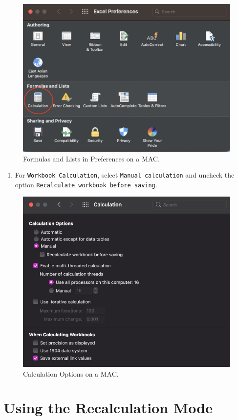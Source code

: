 \documentclass[
]{book}
\providecommand{\tightlist}{%
  \setlength{\itemsep}{0pt}\setlength{\parskip}{0pt}}
\begin{document}
\begin{figure}

{\centering \includegraphics[width=0.6\linewidth]{manual-calculation2} 

}

\caption{Formulas and Lists in Preferences on a MAC.}\label{fig:manual-calculation2}
\end{figure}

\begin{enumerate}
\def\labelenumi{\arabic{enumi}.}
\setcounter{enumi}{2}
\tightlist
\item
  For \texttt{Workbook\ Calculation}, select \texttt{Manual\ calculation} and uncheck the option \texttt{Recalculate\ workbook\ before\ saving}.
\end{enumerate}

\begin{figure}

{\centering \includegraphics[width=0.6\linewidth]{manual-calculation3} 

}

\caption{Calculation Options on a MAC.}\label{fig:manual-calculation3}
\end{figure}

\hypertarget{using-the-recalculation-mode}{%
\section{Using the Recalculation Mode}\label{using-the-recalculation-mode}}
\end{document}
